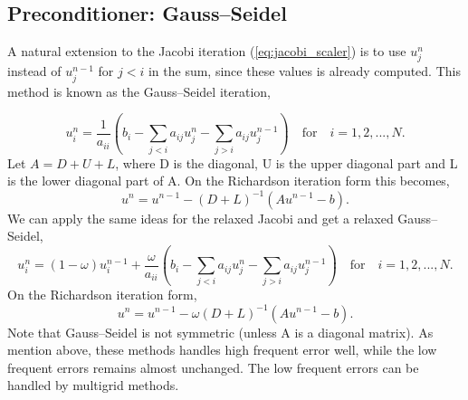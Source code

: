 \subsection{Preconditioner: Gauss--Seidel}
A natural extension to the Jacobi iteration (\ref{eq:jacobi_scaler}) is to use $u^n_j$ 
instead of $u^{n-1}_j$ for $j < i$ in the sum, since these values is already computed. 
This method is known as the Gauss--Seidel iteration, 
 
\begin{equation}
\label{eq:GS_scaler}
u^{n}_{i} = \frac{1}{a_{ii}}(b_i - \sum_{j < i} a_{ij}u^{n}_j - \sum_{j > i} a_{ij}u^{n-1}_j) 
\quad \text{for}\quad i = 1,2, ... , N. 
\end{equation}
Let $A = D + U + L$, where D is the diagonal, U is the upper diagonal part and L is 
the lower diagonal part of A. On the Richardson iteration form this becomes,
\begin{equation}
\label{eq:GS_matrix}
u^n = u^{n-1} - (D + L)^{-1}(Au^{n-1} - b).
\end{equation}
We can apply the same ideas for the relaxed Jacobi and get a relaxed Gauss--Seidel,
\begin{equation}
\label{eq:GS_scaler}
u^{n}_{i} = (1-\omega)u^{n-1}_i  + \frac{\omega}{a_{ii}}(b_i - \sum_{j < i} a_{ij}u^{n}_j - \sum_{j > i} a_{ij}u^{n-1}_j) 
\quad \text{for}\quad i = 1,2, ... , N. 
\end{equation}
On the Richardson iteration form,
\begin{equation}
\label{eq:GS_matrix} 
u^n = u^{n-1} - \omega(D + L)^{-1}(Au^{n-1} - b).
\end{equation}
Note that Gauss--Seidel is not symmetric (unless A is a diagonal matrix). As mention above, 
these methods handles high frequent error well, while the low frequent errors remains almost unchanged.
The low frequent errors can be handled by multigrid methods. 


